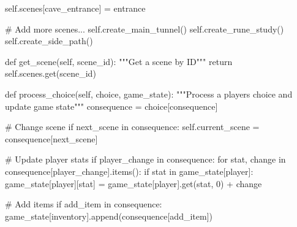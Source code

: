 \documentclass[
  letterpaper,
  DIV=11,
  numbers=noendperiod,
  oneside]{scrreprt}
\newenvironment{Shaded}{}{}
\newcommand{\CommentTok}[1]{\textcolor[rgb]{0.42,0.45,0.49}{#1}}
\newcommand{\ControlFlowTok}[1]{\textcolor[rgb]{0.84,0.23,0.29}{#1}}
\newcommand{\DecValTok}[1]{\textcolor[rgb]{0.00,0.36,0.77}{#1}}
\newcommand{\KeywordTok}[1]{\textcolor[rgb]{0.84,0.23,0.29}{#1}}
\newcommand{\NormalTok}[1]{\textcolor[rgb]{0.14,0.16,0.18}{#1}}
\newcommand{\OperatorTok}[1]{\textcolor[rgb]{0.14,0.16,0.18}{#1}}
\newcommand{\StringTok}[1]{\textcolor[rgb]{0.01,0.18,0.38}{#1}}
\newcommand{\VariableTok}[1]{\textcolor[rgb]{0.89,0.38,0.04}{#1}}
\begin{document}
\begin{Shaded}
\begin{Highlighting}[]
        \VariableTok{self}\NormalTok{.scenes[}\StringTok{\textquotesingle{}cave\_entrance\textquotesingle{}}\NormalTok{] }\OperatorTok{=}\NormalTok{ entrance}
        
        \CommentTok{\# Add more scenes...}
        \VariableTok{self}\NormalTok{.create\_main\_tunnel()}
        \VariableTok{self}\NormalTok{.create\_rune\_study()}
        \VariableTok{self}\NormalTok{.create\_side\_path()}
    
    \KeywordTok{def}\NormalTok{ get\_scene(}\VariableTok{self}\NormalTok{, scene\_id):}
        \CommentTok{"""Get a scene by ID"""}
        \ControlFlowTok{return} \VariableTok{self}\NormalTok{.scenes.get(scene\_id)}
    
    \KeywordTok{def}\NormalTok{ process\_choice(}\VariableTok{self}\NormalTok{, choice, game\_state):}
        \CommentTok{"""Process a player\textquotesingle{}s choice and update game state"""}
\NormalTok{        consequence }\OperatorTok{=}\NormalTok{ choice[}\StringTok{\textquotesingle{}consequence\textquotesingle{}}\NormalTok{]}
        
        \CommentTok{\# Change scene}
        \ControlFlowTok{if} \StringTok{\textquotesingle{}next\_scene\textquotesingle{}} \KeywordTok{in}\NormalTok{ consequence:}
            \VariableTok{self}\NormalTok{.current\_scene }\OperatorTok{=}\NormalTok{ consequence[}\StringTok{\textquotesingle{}next\_scene\textquotesingle{}}\NormalTok{]}
        
        \CommentTok{\# Update player stats}
        \ControlFlowTok{if} \StringTok{\textquotesingle{}player\_change\textquotesingle{}} \KeywordTok{in}\NormalTok{ consequence:}
            \ControlFlowTok{for}\NormalTok{ stat, change }\KeywordTok{in}\NormalTok{ consequence[}\StringTok{\textquotesingle{}player\_change\textquotesingle{}}\NormalTok{].items():}
                \ControlFlowTok{if}\NormalTok{ stat }\KeywordTok{in}\NormalTok{ game\_state[}\StringTok{\textquotesingle{}player\textquotesingle{}}\NormalTok{]:}
\NormalTok{                    game\_state[}\StringTok{\textquotesingle{}player\textquotesingle{}}\NormalTok{][stat] }\OperatorTok{=}\NormalTok{ game\_state[}\StringTok{\textquotesingle{}player\textquotesingle{}}\NormalTok{].get(stat, }\DecValTok{0}\NormalTok{) }\OperatorTok{+}\NormalTok{ change}
        
        \CommentTok{\# Add items}
        \ControlFlowTok{if} \StringTok{\textquotesingle{}add\_item\textquotesingle{}} \KeywordTok{in}\NormalTok{ consequence:}
\NormalTok{            game\_state[}\StringTok{\textquotesingle{}inventory\textquotesingle{}}\NormalTok{].append(consequence[}\StringTok{\textquotesingle{}add\_item\textquotesingle{}}\NormalTok{])}
        

\end{Highlighting}
\end{Shaded}
\end{document}
